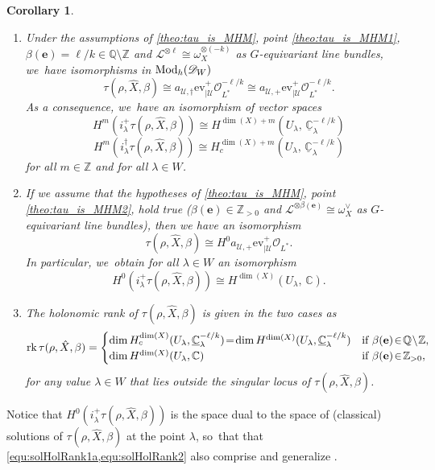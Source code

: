 \documentclass[JEP,XML,SOM,Unicode,published]{cedram}
\let\mathds\mathbb
\newcommand{\bme}{{\boldsymbol{e}}}
\newcommand{\ev}{\mathrm{ev}}
\newtheorem{cor}[thm]{Corollary}
\newcommand{\dC}{{\mathds C}}\let\C\dC
\newcommand{\dQ}{{\mathds Q}}\let\Q\dQ
\newcommand{\dZ}{{\mathds Z}}\let\mbz\dZ\let\Z\dZ
\newcommand{\Ell}{\mathscr{L}}
\newcommand{\cO}{\mathcal{O}}\let\O\cO
\newcommand{\cU}{\mathcal{U}}\let\mcu\cU
\DeclareMathOperator{\rk}{rk}
\begin{document}
\skpt
\begin{cor}\label{cor:holRankProb}
\begin{enumerate}
\item
Under the assumptions of \cref{theo:tau_is_MHM}, point \eqref{theo:tau_is_MHM1}, \ie $\beta(\bme) =\ell/k\in\dQ\setminus\dZ$ and $\Ell^{\otimes \ell} \cong \omega_X^{\otimes (-k)}$ as $G$-equivariant line bundles, we~have isomorphisms in $\textup{Mod}_h(\mathscr{D}_W)$
\[
\tau(\rho,\hat X, \beta) \cong a_{\cU,\dag} {\ev_{|\cU}^+}\cO_{L^*}^{-\ell/k} \cong a_{\cU,+} {\ev_{|\cU}^+}\cO_{L^*}^{-\ell/k}.
\]
As a consequence, we~have an isomorphism of vector spaces
\begin{equation}\label{equ:solHolRank1a}
H^m (i_\lambda^+ \tau(\rho, \hat X, \beta)) \cong H^{\dim(X) +m}(U_\lambda,\,\underline{\dC}^{-\ell/k}_\lambda)
\end{equation}
\resp
\begin{equation}\label{equ:solHolRank1b}
H^m (i_\lambda^\dag \tau(\rho, \hat X, \beta)) \cong H_c^{\dim(X) + m}(U_\lambda,\,\underline{\dC}^{-\ell/k}_\lambda)
\end{equation}
for all $m \in \Z$ and for all $\lambda\in W$.
\item
If we assume that the hypotheses of \cref{theo:tau_is_MHM}, point \eqref{theo:tau_is_MHM2}, hold true (\ie $\beta(\bme)\in \dZ_{>0}$ and $\Ell^{\otimes \beta(\bme)} \cong \omega_X^\vee$ as $G$-equivariant line bundles), then we have an isomorphism
\[
\tau(\rho,\hat X, \beta) \cong H^0 a_{\cU,+} {\ev_{|\cU}^+}\cO_{L^*}.
\]
In particular, we~obtain for all $\lambda\in W$ an isomorphism
\begin{equation}\label{equ:solHolRank2}
H^0 (i_\lambda^+ \tau(\rho, \hat X, \beta)) \cong H^{\dim(X)}(U_\lambda,\,\dC).
\end{equation}

\item The holonomic rank of $\tau(\rho,\hat X, \beta)$ is given in the two cases as
\[
\rk \tau(\rho, \hat X, \beta) =
\begin{cases}
\dim H_c^{\dim(X)}(U_\lambda, \underline{\dC}_\lambda^{-\ell/k})\!=\!
\dim H^{\dim(X)}(U_\lambda, \underline{\dC}_\lambda^{-\ell/k}) &
\textup{if } \beta(\mathbf{e})\!\in\!\dQ\!\setminus\!\dZ,\\
\dim H^{\dim(X)}(U_\lambda, \dC)  & \textup{if }\beta(\mathbf{e})\!\in\!\dZ_{>0},
\end{cases}
\]
for any value $\lambda\in W$ that lies outside the singular locus of $\tau(\rho,\hat X, \beta)$. \end{enumerate}
\end{cor}
Notice that $H^0 (i_\lambda^+ \tau(\rho, \hat X, \beta))$ is the space dual to the space of (classical) solutions of $\tau(\rho, \hat{X},\beta)$ at the point $\lambda$, so~that that \cref{equ:solHolRank1a,equ:solHolRank2} also comprise and generalize \cite[Cor.\,2.3]{HuangLianZhu}.
\end{document}
